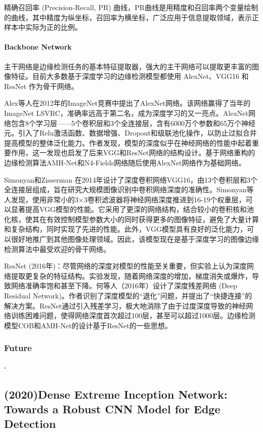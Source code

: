 \documentclass[a4paper, 10pt]{article}
\begin{document}
			精确召回率 (Precision-Recall, PR) 曲线，PR曲线是用精度和召回率两个变量绘制的曲线，其中精度为纵坐标，召回率为横坐标，广泛应用于信息提取领域，表示正样本中实际为正的比例。
			
			\paragraph{Backbone Network}
			
			主干网络是边缘检测任务的基本特征提取器，强大的主干网络可以提取更丰富的图像特征。目前大多数基于深度学习的边缘检测模型都使用 AlexNet\cite{krizhevsky2012imagenet}、VGG16\cite{simonyan2014very} 和 ResNet\cite{he2016deep} 作为骨干网络。
			
			Alex等人在2012年的ImageNet竞赛中提出了AlexNet网络。该网络赢得了当年的ImageNet LSVRC，准确率远高于第二名，成为深度学习的又一亮点。AlexNet网络包含8个学习层——5个卷积层和3个全连接层，含有6000万个参数和65万个神经元。引入了Relu激活函数、数据增强、Dropout和级联池化操作，以防止过拟合并提高模型的整体泛化能力。作者发现，模型的深度似乎在神经网络的性能中起着重要作用，这一发现也启发了后来VGG和ResNet网络的结构设计。基于网络重构的边缘检测算法AMH-Net和N4-Fields网络随后使用AlexNet网络作为基础网络。
			
			Simonyan和Zisserman 在2014年设计了深度卷积网络VGG16，由13个卷积层和3个全连接层组成，旨在研究大规模图像识别中卷积网络深度的准确性。Simonyan等人发现，使用非常小的3×3卷积滤波器将神经网络深度推进到16-19个权重层，可以显著提高VGG模型的性能。它采用了更深的网络结构，结合较小的卷积核和池化核，使其在有效控制模型参数大小的同时获得更多的图像特征，避免了大量计算和复杂结构，同时实现了先进的性能。此外，VGG模型具有良好的泛化能力，可以很好地推广到其他图像处理领域。因此，该模型现在是基于深度学习的图像边缘检测算法中最受欢迎的骨干网络。
			
			ResNet (2016年)：尽管网络的深度对模型的性能至关重要，但实验上认为深度网络提取更复杂的特征结构。实验发现，随着网络深度的增加，梯度消失或爆炸，导致网络准确率饱和甚至下降。何等人（2016年）设计了深度残差网络 (Deep Residual Network)。作者识别了深度模型的“退化”问题，并提出了“快捷连接”的解决方案。ResNet通过引入残差学习，极大地消除了由于过度深度导致的神经网络训练困难问题，使得网络深度首次超过100层，甚至可以超过1000层。边缘检测模型COB和AMH-Net的设计基于ResNet的一些思想。
			
			\subsubsection{Future}
			-
			
		\subsection{(2020)Dense Extreme Inception Network: Towards a Robust CNN Model for Edge Detection}
		
\end{document}
